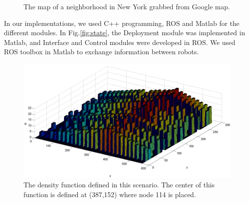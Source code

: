 \documentclass[smallcondensed]{svjour3}
\begin{document}
\begin{figure}[H]
	\centering	
	\caption{The map of a neighborhood in New York grabbed from Google map.}
	\label{fig:googlemap}
\end{figure}

In our implementations, we used C++ programming, ROS and Matlab for the different modules. In Fig.\ref{fig:state}, the Deployment module was implemented in Matlab, and Interface and Control modules were developed in ROS. We used ROS toolbox in Matlab to exchange information between robots.

%
\begin{figure}[t]
	\centering	
   	\includegraphics[width=0.85\columnwidth]{Figures/Fig12.png}
	\caption[The density function.]{The density function defined in this scenario. The center of this function is defined at (387,152) where node 114  is placed.}
	\label{fig:googlemapdens}
\end{figure}
%
\end{document}
